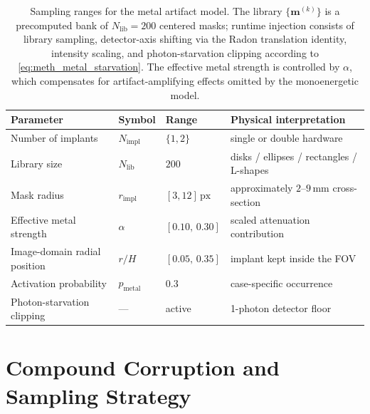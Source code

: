 \begin{table}[!htb]
    \centering
    \caption[Parameters of the metal artifact model.]{%
        Sampling ranges for the metal artifact model. The library $\{\mathbf{m}^{(k)}\}$ is a precomputed bank of
        $N_\text{lib}=200$ centered masks; runtime injection consists of library sampling, detector-axis shifting via the
        Radon translation identity, intensity scaling, and photon-starvation clipping according to \eqref{eq:meth_metal_starvation}. The effective metal strength is controlled by $\alpha$, which compensates for artifact-amplifying effects omitted by the monoenergetic model.}
    \label{tab:meth_metal_params}
    \setlength{\tabcolsep}{4pt}
    \small
    \begin{tabular}{@{}l l l l@{}}
        \toprule
        Parameter                    & Symbol              & Range                & Physical interpretation \\
        \midrule
        Number of implants           & $N_\mathrm{impl}$   & $\{1,2\}$            & single or double hardware \\
        Library size                 & $N_\text{lib}$      & $200$                & disks / ellipses / rectangles / L-shapes \\
        Mask radius                  & $r_\mathrm{impl}$   & $[3,12]\,\text{px}$  & approximately $2$--$9\,\text{mm}$ cross-section \\
        Effective metal strength     & $\alpha$            & $[0.10,\,0.30]$      & scaled attenuation contribution \\
        Image-domain radial position & $r/H$               & $[0.05,\,0.35]$      & implant kept inside the FOV \\
        Activation probability       & $p_\mathrm{metal}$  & $0.3$                & case-specific occurrence \\
        Photon-starvation clipping   & ---                 & active               & 1-photon detector floor \\
        \bottomrule
    \end{tabular}
\end{table}

\section{Compound Corruption and Sampling Strategy}
\label{sec:meth_compound}

